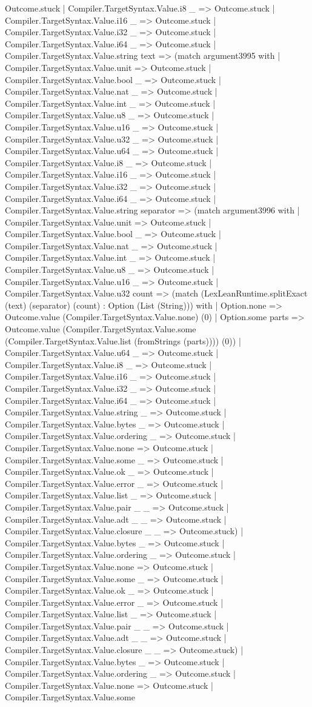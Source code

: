 \documentclass[11pt]{article}
\begin{document}
Outcome.stuck | Compiler.TargetSyntax.Value.i8 \_ => Outcome.stuck | Compiler.TargetSyntax.Value.i16 \_ => Outcome.stuck | Compiler.TargetSyntax.Value.i32 \_ => Outcome.stuck | Compiler.TargetSyntax.Value.i64 \_ => Outcome.stuck | Compiler.TargetSyntax.Value.string text => (match argument3995 with | Compiler.TargetSyntax.Value.unit => Outcome.stuck | Compiler.TargetSyntax.Value.bool \_ => Outcome.stuck | Compiler.TargetSyntax.Value.nat \_ => Outcome.stuck | Compiler.TargetSyntax.Value.int \_ => Outcome.stuck | Compiler.TargetSyntax.Value.u8 \_ => Outcome.stuck | Compiler.TargetSyntax.Value.u16 \_ => Outcome.stuck | Compiler.TargetSyntax.Value.u32 \_ => Outcome.stuck | Compiler.TargetSyntax.Value.u64 \_ => Outcome.stuck | Compiler.TargetSyntax.Value.i8 \_ => Outcome.stuck | Compiler.TargetSyntax.Value.i16 \_ => Outcome.stuck | Compiler.TargetSyntax.Value.i32 \_ => Outcome.stuck | Compiler.TargetSyntax.Value.i64 \_ => Outcome.stuck | Compiler.TargetSyntax.Value.string separator => (match argument3996 with | Compiler.TargetSyntax.Value.unit => Outcome.stuck | Compiler.TargetSyntax.Value.bool \_ => Outcome.stuck | Compiler.TargetSyntax.Value.nat \_ => Outcome.stuck | Compiler.TargetSyntax.Value.int \_ => Outcome.stuck | Compiler.TargetSyntax.Value.u8 \_ => Outcome.stuck | Compiler.TargetSyntax.Value.u16 \_ => Outcome.stuck | Compiler.TargetSyntax.Value.u32 count => (match (LexLeanRuntime.splitExact (text) (separator) (count) : Option (List (String))) with | Option.none => Outcome.value (Compiler.TargetSyntax.Value.none) (0) | Option.some parts => Outcome.value (Compiler.TargetSyntax.Value.some (Compiler.TargetSyntax.Value.list (fromStrings (parts)))) (0)) | Compiler.TargetSyntax.Value.u64 \_ => Outcome.stuck | Compiler.TargetSyntax.Value.i8 \_ => Outcome.stuck | Compiler.TargetSyntax.Value.i16 \_ => Outcome.stuck | Compiler.TargetSyntax.Value.i32 \_ => Outcome.stuck | Compiler.TargetSyntax.Value.i64 \_ => Outcome.stuck | Compiler.TargetSyntax.Value.string \_ => Outcome.stuck | Compiler.TargetSyntax.Value.bytes \_ => Outcome.stuck | Compiler.TargetSyntax.Value.ordering \_ => Outcome.stuck | Compiler.TargetSyntax.Value.none => Outcome.stuck | Compiler.TargetSyntax.Value.some \_ => Outcome.stuck | Compiler.TargetSyntax.Value.ok \_ => Outcome.stuck | Compiler.TargetSyntax.Value.error \_ => Outcome.stuck | Compiler.TargetSyntax.Value.list \_ => Outcome.stuck | Compiler.TargetSyntax.Value.pair \_ \_ => Outcome.stuck | Compiler.TargetSyntax.Value.adt \_ \_ => Outcome.stuck | Compiler.TargetSyntax.Value.closure \_ \_ => Outcome.stuck) | Compiler.TargetSyntax.Value.bytes \_ => Outcome.stuck | Compiler.TargetSyntax.Value.ordering \_ => Outcome.stuck | Compiler.TargetSyntax.Value.none => Outcome.stuck | Compiler.TargetSyntax.Value.some \_ => Outcome.stuck | Compiler.TargetSyntax.Value.ok \_ => Outcome.stuck | Compiler.TargetSyntax.Value.error \_ => Outcome.stuck | Compiler.TargetSyntax.Value.list \_ => Outcome.stuck | Compiler.TargetSyntax.Value.pair \_ \_ => Outcome.stuck | Compiler.TargetSyntax.Value.adt \_ \_ => Outcome.stuck | Compiler.TargetSyntax.Value.closure \_ \_ => Outcome.stuck) | Compiler.TargetSyntax.Value.bytes \_ => Outcome.stuck | Compiler.TargetSyntax.Value.ordering \_ => Outcome.stuck | Compiler.TargetSyntax.Value.none => Outcome.stuck | Compiler.TargetSyntax.Value.some 
\end{document}
